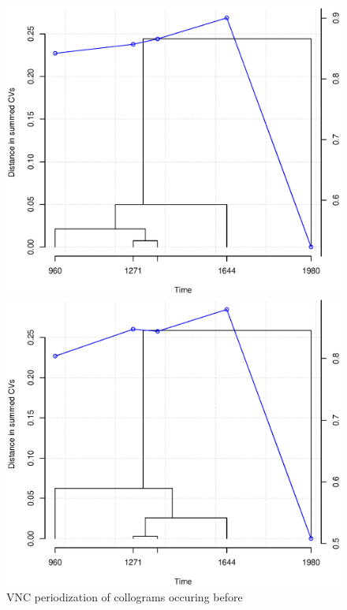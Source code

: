 \begin{figure}[H]
\centering
\begin{minipage}[b]{0.3\linewidth}
  \includegraphics[width=\textwidth]{figures/pre_VNC_cor.eps}
  \caption{VNC periodization of collograms occuring before \jia}
  \label{fig:pre_VNC}
\end{minipage}
\quad
\begin{minipage}[b]{0.3\linewidth}
  \includegraphics[width=\textwidth]{figures/post_VNC_cor.eps}

\end{minipage}
\end{figure}
